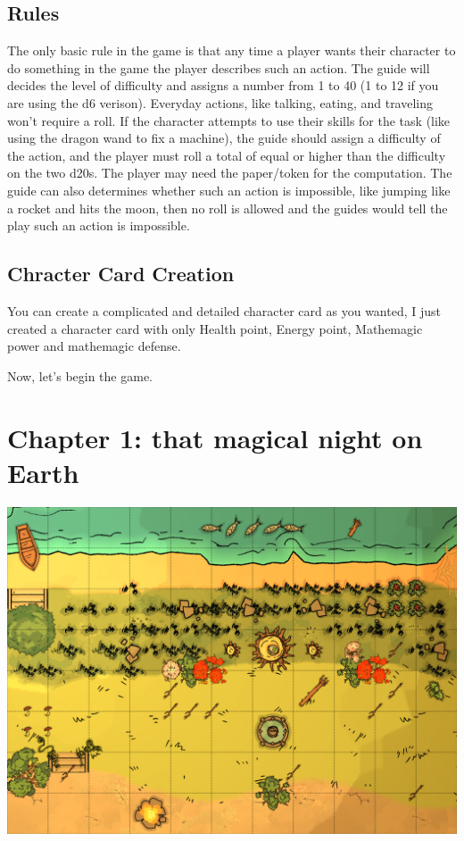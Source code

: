 \documentclass[a4paper,12pt]{article}
\begin{document}
\subsection{Rules}

The only basic rule in the game is that any time a player wants their character to do something in the game the player describes such an action. The guide will decides the level of difficulty and assigns a number from 1 to 40 (1 to 12 if you are using the d6 verison). Everyday actions, like talking, eating, and traveling won't require a roll. If the character attempts to use their skills for the task (like using the dragon wand to fix a machine), the guide should assign a difficulty of the action, and the player must roll a total of equal or higher than the difficulty on the two d20s. The player may need the paper/token for the computation. The guide can also determines whether such an action is impossible, like jumping like a rocket and hits the moon, then no roll is allowed and the guides would tell the play such an action is impossible.

\subsection{Chracter Card Creation}
You can create a complicated and detailed character card as you wanted, I just created a character card with only Health point, Energy point, Mathemagic power and mathemagic defense.


Now, let's begin the game.
\newpage

\section{Chapter 1: that magical night on Earth}

\includegraphics[height=1.1\textwidth, angle=90]{chap1.jpg}
\end{document}
